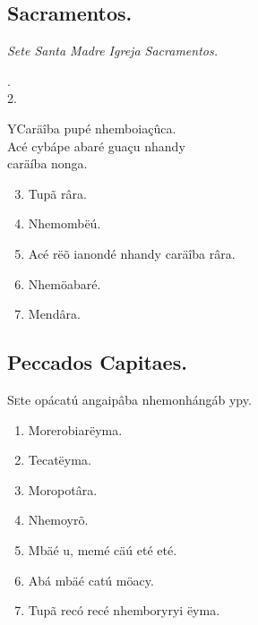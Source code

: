 \documentclass[openany,titlepage,12pt]{book}
\newcommand{\comecalista}[5]{
    \hspace*{-11.7pt}
    \begin{minipage}[t]{0.08\linewidth}
        \flushright #1\\#2
    \end{minipage}
    \hspace{0pt}
    \begin{minipage}[t]{0.94\linewidth}
        \lettrine
        [findent =2pt, nindent=0pt,  lines=2]
        {#3}{#4}#5
    \end{minipage}
    \vspace*{-3pt}
}
\begin{document}
\subsection{Sacramentos.}
\begin{center}
     \textit{Sete Santa Madre Igreja Sacramentos.}
\end{center}
\comecalista{1.}{2.}{Y}{C}
    {aräîba pupé nhemboiaçûca.\\
    Acé cybápe abaré guaçu nhandy\\\hspace*{14pt} caräíba nonga.}
\begin{enumerate}
    \setcounter{enumi}{2}
    \item Tupã râra.
    \item Nhemombëú.
    \item Acé rëõ ianondé nhandy caräîba râra.
    \item Nhemöabaré.
    \item Mendâra.
\end{enumerate}
\vspace{\baselineskip}

\subsection{Peccados Capitaes.}

\lettrine[findent =2pt, nindent=0pt, lines=2]
{S}{e}te opácatú angaipâba nhemonhángáb ypy.
\begin{enumerate}
    \item Morerobiarëyma.
    \item Tecatëyma.
    \item Moropotâra.
    \item Nhemoyrõ.
    \item Mbäé u, memé cäú eté eté.
    \item Abá mbäé catú möacy.
    \item Tupã recó recé nhemboryryi ëyma.
\end{enumerate}
\end{document}
